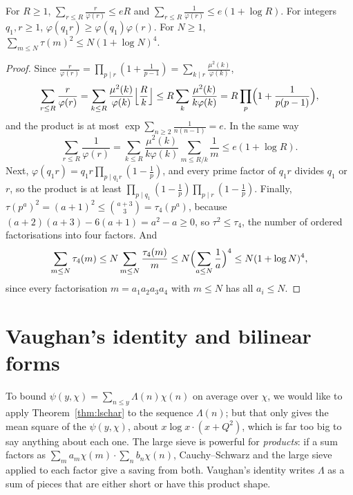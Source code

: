 \begin{lemma}\label{lem:phisum}
For $R\ge1$, $\sum_{r\le R}\frac r{\varphi(r)}\le eR$ and $\sum_{r\le R}\frac1{\varphi(r)}\le e(1+\log R)$. For integers $q_1,r\ge1$, $\varphi(q_1r)\ge\varphi(q_1)\varphi(r)$. For $N\ge1$, $\sum_{m\le N}\tau(m)^2\le N(1+\log N)^4$.
\end{lemma}
\begin{proof}
Since $\frac r{\varphi(r)}=\prod_{p\mid r}(1+\frac1{p-1})=\sum_{k\mid r}\frac{\mu^2(k)}{\varphi(k)}$,
\[
\sum_{r\le R}\frac r{\varphi(r)}=\sum_{k\le R}\frac{\mu^2(k)}{\varphi(k)}\Bigl\lfloor\frac Rk\Bigr\rfloor\le R\sum_k\frac{\mu^2(k)}{k\varphi(k)}=R\prod_p\Bigl(1+\frac1{p(p-1)}\Bigr),
\]
and the product is at most $\exp\sum_{n\ge2}\frac1{n(n-1)}=e$. In the same way
\[
\sum_{r\le R}\frac1{\varphi(r)}=\sum_{k\le R}\frac{\mu^2(k)}{k\varphi(k)}\sum_{m\le R/k}\frac1m\le e(1+\log R).
\] Next, $\varphi(q_1r)=q_1r\prod_{p\mid q_1r}(1-\frac1p)$, and every prime factor of $q_1r$ divides $q_1$ or $r$, so the product is at least $\prod_{p\mid q_1}(1-\frac1p)\prod_{p\mid r}(1-\frac1p)$.
Finally, $\tau(p^a)^2=(a+1)^2\le\binom{a+3}3=\tau_4(p^a)$, because $(a+2)(a+3)-6(a+1)=a^2-a\ge0$, so $\tau^2\le\tau_4$, the number of ordered factorisations into four factors. And
\[
\sum_{m\le N}\tau_4(m)\le N\sum_{m\le N}\frac{\tau_4(m)}m\le N\Bigl(\sum_{a\le N}\frac1a\Bigr)^4\le N(1+\log N)^4,
\]
since every factorisation $m=a_1a_2a_3a_4$ with $m\le N$ has all $a_i\le N$.
\end{proof}

\section{Vaughan's identity and bilinear forms}

To bound $\psi(y,\chi)=\sum_{n\le y}\Lambda(n)\chi(n)$ on average over $\chi$, we would like to apply Theorem~\ref{thm:lschar} to the sequence $\Lambda(n)$; but that only gives the mean square of the $\psi(y,\chi)$, about $x\log x\cdot(x+Q^2)$, which is far too big to say anything about each one. The large sieve is powerful for \emph{products}: if a sum factors as $\sum_ma_m\chi(m)\cdot\sum_nb_n\chi(n)$, Cauchy--Schwarz and the large sieve applied to each factor give a saving from both. Vaughan's identity writes $\Lambda$ as a sum of pieces that are either short or have this product shape.

